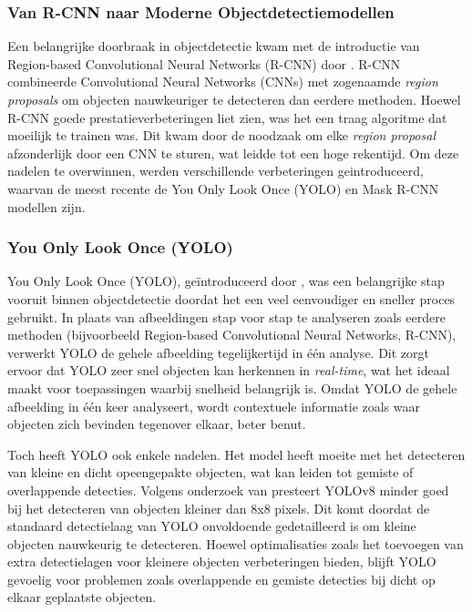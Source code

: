 \subsubsection{Van R-CNN naar Moderne Objectdetectiemodellen}

Een belangrijke doorbraak in objectdetectie kwam met de introductie van Region-based Convolutional Neural Networks (R-CNN) door \textcite{Girshick2014}.
R-CNN combineerde Convolutional Neural Networks (CNNs) met zogenaamde \textit{region proposals} om objecten nauwkeuriger te detecteren dan eerdere methoden.
Hoewel R-CNN goede prestatieverbeteringen liet zien, was het een traag algoritme dat moeilijk te trainen was. 
Dit kwam door de noodzaak om elke \textit{region proposal} afzonderlijk door een CNN te sturen, wat leidde tot een hoge rekentijd.
Om deze nadelen te overwinnen, werden verschillende verbeteringen geintroduceerd, waarvan de meest recente de You Only Look Once (YOLO) en Mask R-CNN modellen zijn.

\subsubsection{You Only Look Once (YOLO)}

You Only Look Once (YOLO), geïntroduceerd door \textcite{Redmon2016}, was een belangrijke stap vooruit binnen objectdetectie doordat het een veel eenvoudiger en sneller proces gebruikt. 
In plaats van afbeeldingen stap voor stap te analyseren zoals eerdere methoden (bijvoorbeeld Region-based Convolutional Neural Networks, R-CNN), verwerkt YOLO de gehele afbeelding tegelijkertijd in één analyse. 
Dit zorgt ervoor dat YOLO zeer snel objecten kan herkennen in \textit{real-time}, wat het ideaal maakt voor toepassingen waarbij snelheid belangrijk is.
Omdat YOLO de gehele afbeelding in één keer analyseert, wordt contextuele informatie zoals waar objecten zich bevinden tegenover elkaar, beter benut.

Toch heeft YOLO ook enkele nadelen. Het model heeft moeite met het detecteren van kleine en dicht opeengepakte objecten, wat kan leiden tot gemiste of overlappende detecties. 
Volgens onderzoek van \textcite{Huang2024} presteert YOLOv8 minder goed bij het detecteren van objecten kleiner dan 8x8 pixels. 
Dit komt doordat de standaard detectielaag van YOLO onvoldoende gedetailleerd is om kleine objecten nauwkeurig te detecteren. 
Hoewel optimalisaties zoals het toevoegen van extra detectielagen voor kleinere objecten verbeteringen bieden, blijft YOLO gevoelig voor problemen zoals overlappende en gemiste detecties bij dicht op elkaar geplaatste objecten.

